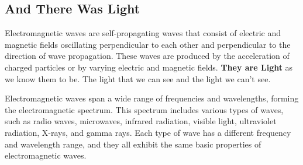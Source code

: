 \documentclass[12pt,b4paper]{article}
\begin{document}
\subsection{And There Was Light}
Electromagnetic waves are self-propagating waves that consist of electric and magnetic fields oscillating perpendicular to each other and perpendicular to the direction of wave propagation. These waves are produced by the acceleration of charged particles or by varying electric and magnetic fields. \textbf{They are Light} as we know them to be. The light that we can see and the light we can't see.

Electromagnetic waves span a wide range of frequencies and wavelengths, forming the electromagnetic spectrum. This spectrum includes various types of waves, such as radio waves, microwaves, infrared radiation, visible light, ultraviolet radiation, X-rays, and gamma rays. Each type of wave has a different frequency and wavelength range, and they all exhibit the same basic properties of electromagnetic waves.
\end{document}

